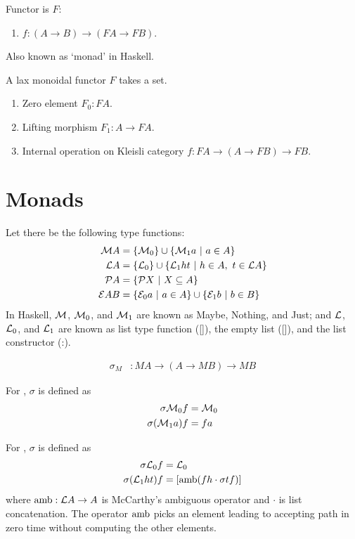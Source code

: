 Functor is $F$:
\begin{enumerate}
    \item $f : (A \to B) \to (FA \to FB)$.
\end{enumerate}

Also known as `monad' in Haskell.

A lax monoidal functor $F$ takes a set.
\begin{enumerate}
    \item Zero element $F_0 : FA$.
    \item Lifting morphism $F_1 : A \to FA$.
    \item Internal operation on Kleisli category $f : FA \to (A \to FB) \to FB$.
\end{enumerate}

\section{Monads}

Let there be the following type functions:
\begin{align}
    \mathcal M A &= \{ \mathcal M_0 \} \cup \{ \mathcal M_1 a ~|~ a \in A \}
 \\ \mathcal L A &= \{ \mathcal L_0 \} \cup \{ \mathcal L_1 h t ~|~ h \in A, ~ t \in \mathcal L A \}
 \\ \mathcal P A &= \{ \mathcal P X ~|~ X \subseteq A \}
\\ \mathcal E AB &= \{ \mathcal E_0 a ~|~ a \in A \} \cup \{ \mathcal E_1 b ~|~ b \in B \}
\end{align}
In Haskell, $\mathcal M$, $\mathcal M_0$, and $\mathcal M_1$ are known as Maybe, Nothing, and Just;
and $\mathcal L$, $\mathcal L_0$, and $\mathcal L_1$ are known as list type function ([]), the empty list ([]), and the list constructor (:).

\begin{align}
    \sigma_M &: MA \to (A \to MB) \to MB
\end{align}

For \mM, $\sigma$ is defined as
\begin{align}
    \sigma \mathcal M_0 f &= \mathcal M_0
    \\ \sigma (\mathcal M_1 a) f &= fa
\end{align}

For \mL, $\sigma$ is defined as
\begin{align}
    \sigma \mathcal L_0 f &= \mathcal L_0
    \\ \sigma (\mathcal L_1 h t) f &= [\operatorname{amb} (fh \cdot \sigma tf)]
\end{align}
where $\operatorname{amb} : \mathcal L A \to A$ is McCarthy's ambiguous operator
and $\cdot$ is list concatenation.
The operator $\operatorname{amb}$ picks an element leading to accepting path
in zero time without computing the other elements.

